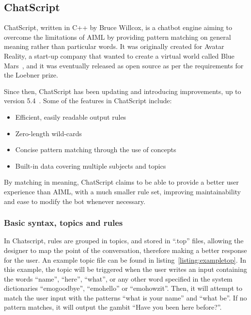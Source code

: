 \subsection{ChatScript}
\label{subsec:chatscript}

ChatScript, written in C++ by Bruce Willcox, is a chatbot engine aiming to overcome the limitations of \ac{AIML} by providing pattern matching on general meaning rather than particular words. It was originally created for Avatar Reality, a start-up company that wanted to create a virtual world called Blue Mars~\cite{Wilcox2010suzzete}, and it was eventually released as open source as per the requirements for the Loebner prize.

Since then, ChatScript has been updating and introducing improvements, up to version 5.4~\cite{ChatScriptSourceForge}. Some of the features in ChatScript include:
\begin{itemize}
 \item Efficient, easily readable output rules
 \item Zero-length wild-cards
 \item Concise pattern matching through the use of concepts
 \item Built-in data covering multiple subjects and topics
\end{itemize}

By matching in meaning, ChatScript claims to be able to provide a better user experience than \ac{AIML}, with a much smaller rule set, improving maintainability and ease to modify the bot whenever necessary.

\subsubsection{Basic syntax, topics and rules}

In Chatscript, rules are grouped in topics, and stored in ``.top'' files, allowing the designer to map the point of the conversation, therefore making a better response for the user. An example topic file can be found in listing~\ref{listing:exampletop}. In this example, the topic will be triggered when the user writes an input containing the words ``name'', ``here'', ``what'', or any other word specified in the system dictionaries ``emogoodbye'', ``emohello'' or ``emohowzit''. Then, it will attempt to match the user input with the patterns ``what is your name'' and ``what be''. If no pattern matches, it will output the gambit ``Have you been here before?''.

